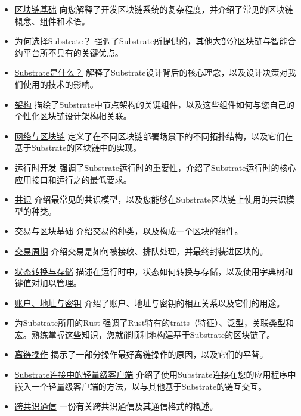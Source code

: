 \begin{itemize}
\item
  \href{/fundamentals/blockchain-basics/}{区块链基础}
  向您解释了开发区块链系统的复杂程度，并介绍了常见的区块链概念、组件和术语。
\item
  \href{/fundamentals/why-substrate/}{为何选择Substrate？}
  强调了Substrate所提供的，其他大部分区块链与智能合约平台所不具有的关键优点。
\item
  \href{/fundamentals/what-is-substrate/}{Substrate是什么？}
  解释了Substrate设计背后的核心理念，以及设计决策对我们使用的技术的影响。
\item
  \href{/fundamentals/architecture/}{架构}
  描绘了Substrate中节点架构的关键组件，以及这些组件如何与您自己的个性化区块链设计架构相关联。
\item
  \href{/fundamentals/node-and-network-types/}{网络与区块链}
  定义了在不同区块链部署场景下的不同拓扑结构，以及它们在基于Substrate的区块链中的实现。
\item
  \href{/fundamentals/runtime-development/}{运行时开发}
  强调了Substrate运行时的重要性，介绍了Substrate运行时的核心应用接口和运行之的最低要求。
\item
  \href{/fundamentals/consensus/}{共识}
  介绍最常见的共识模型，以及您能够在Substrate区块链上使用的共识模型的种类。
\item
  \href{/fundamentals/transaction-types/}{交易与区块基础}
  介绍交易的种类，以及构成一个区块的组件。
\item
  \href{/fundamentals/transaction-lifecycle/}{交易周期}
  介绍交易是如何被接收、排队处理，并最终封装进区块的。
\item
  \href{/fundamentals/state-transitions-and-storage/}{状态转换与存储}
  描述在运行时中，状态如何转换与存储，以及使用字典树和键值对加以管理。
\item
  \href{/fundamentals/accounts-addresses-keys/}{账户、地址与密钥}
  介绍了账户、地址与密钥的相互关系以及它们的用途。
\item
  \href{/fundamentals/rust-basics/}{为Substrate所用的Rust}
  强调了Rust特有的traits（特征）、泛型，关联类型和宏。熟练掌握这些知识，您就能顺利地构建基于Substrate的区块链了。
\item
  \href{/fundamentals/offchain-operations/}{离链操作}
  揭示了一部分操作最好离链操作的原因，以及它们的平替。
\item
  \href{/fundamentals/light-clients-in-substrate-connect/}{Substrate连接中的轻量级客户端}
  介绍了使用Substrate连接在您的应用程序中嵌入一个轻量级客户端的方法，以与其他基于Substrate的链互交互。
\item
  \href{/fundamentals/xcm-communication/}{跨共识通信}
  一份有关跨共识通信及其通信格式的概述。
\end{itemize}


